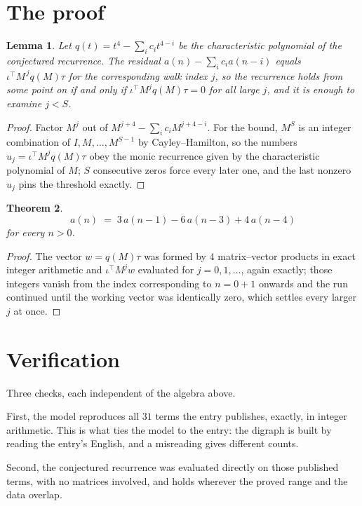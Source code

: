 \documentclass[11pt,a4paper]{article}
\theoremstyle{plain}
\newtheorem{theorem}{Theorem}
\newtheorem{lemma}[theorem]{Lemma}
\theoremstyle{definition}
\begin{document}
\section{The proof}

\begin{lemma}\label{lem:crit}
Let $q(t)=t^{4}-\sum_i c_it^{4-i}$ be the characteristic polynomial of the
conjectured recurrence. The residual $a(n)-\sum_ic_ia(n-i)$ equals
$\iota^{\!\top}M^{\,j}q(M)\tau$ for the corresponding walk index $j$, so the recurrence
holds from some point on if and only if $\iota^{\!\top}M^{j}q(M)\tau=0$ for all large $j$,
and it is enough to examine $j<S$.
\end{lemma}

\begin{proof}
Factor $M^{j}$ out of $M^{j+4}-\sum_ic_iM^{j+4-i}$. For the bound, $M^{S}$
is an integer combination of $I,M,\dots,M^{S-1}$ by Cayley--Hamilton, so the numbers
$u_j=\iota^{\!\top}M^{j}q(M)\tau$ obey the monic recurrence given by the characteristic
polynomial of $M$; $S$ consecutive zeros force every later one, and the last nonzero $u_j$
pins the threshold exactly.
\end{proof}

\begin{theorem}
\[
a(n)\;=\;3\,a(n-1) - 6\,a(n-3) + 4\,a(n-4)
\]
for every $n>0$.
\end{theorem}

\begin{proof}
The vector $w=q(M)\tau$ was formed by $4$ matrix--vector products in exact integer
arithmetic and $\iota^{\!\top}M^{j}w$ evaluated for $j=0,1,\dots$, again exactly; those
integers vanish from the index corresponding to $n=0+1$ onwards and the run continued
until the working vector was identically zero, which settles every larger $j$ at once.
\end{proof}

\section{Verification}

Three checks, each independent of the algebra above.

First, the model reproduces all $31$ terms the entry publishes, exactly, in integer
arithmetic. This is what ties the model to the entry: the digraph is built by reading the
entry's English, and a misreading gives different counts.

Second, the conjectured recurrence was evaluated directly on those published terms, with no
matrices involved, and holds wherever the proved range and the data overlap.
\end{document}
